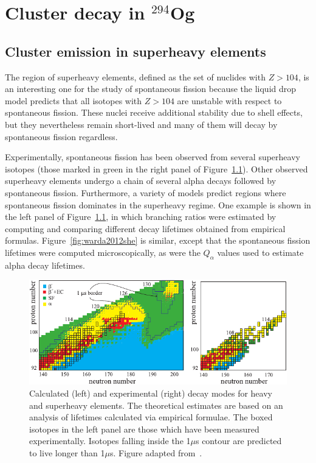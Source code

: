 \chapter{Cluster decay in $^{294}$Og}\label{chap:294Og}

\section{Cluster emission in superheavy elements}

The region of superheavy elements, defined as the set of nuclides with $Z>104$, is an interesting one for the study of spontaneous fission because the liquid drop model predicts that all isotopes with $Z>104$ are unstable with respect to spontaneous fission. These nuclei receive additional stability due to shell effects, but they nevertheless remain short-lived and many of them will decay by spontaneous fission regardless.

Experimentally, spontaneous fission has been observed from several superheavy isotopes (those marked in green in the right panel of Figure~\ref{fig:karpovshedecay}). Other observed superheavy elements undergo a chain of several alpha decays followed by spontaneous fission. Furthermore, a variety of models predict regions where spontaneous fission dominates in the superheavy regime. One example is shown in the left panel of Figure~\ref{fig:karpovshedecay}, in which branching ratios were estimated by computing and comparing different decay lifetimes obtained from empirical formulas. Figure~\ref{fig:warda2012she} is similar, except that the spontaneous fission lifetimes were computed microscopically, as were the $Q_\alpha$ values used to estimate alpha decay lifetimes.


\begin{figure}
	\centering
	\includegraphics[width=0.9\linewidth]{TeX_files/294Og_Karpov_SHEdecay}
	\caption[Calculated (left) and experimental (right) decay modes for heavy and superheavy elements. The theoretical estimates are based on an analysis of lifetimes calculated via empirical formulae. The boxed isotopes in the left panel are those which have been measured experimentally. Isotopes falling inside the 1$\mu$s contour are predicted to live longer than 1$\mu$s. Figure adapted from~\cite{Karpova}.]{Calculated (left) and experimental (right) decay modes for heavy and superheavy elements. The theoretical estimates are based on an analysis of lifetimes calculated via empirical formulae. The boxed isotopes in the left panel are those which have been measured experimentally. Isotopes falling inside the 1$\mu$s contour are predicted to live longer than 1$\mu$s. Figure adapted from~\cite{Karpova}.}
	\label{fig:karpovshedecay}
\end{figure}


